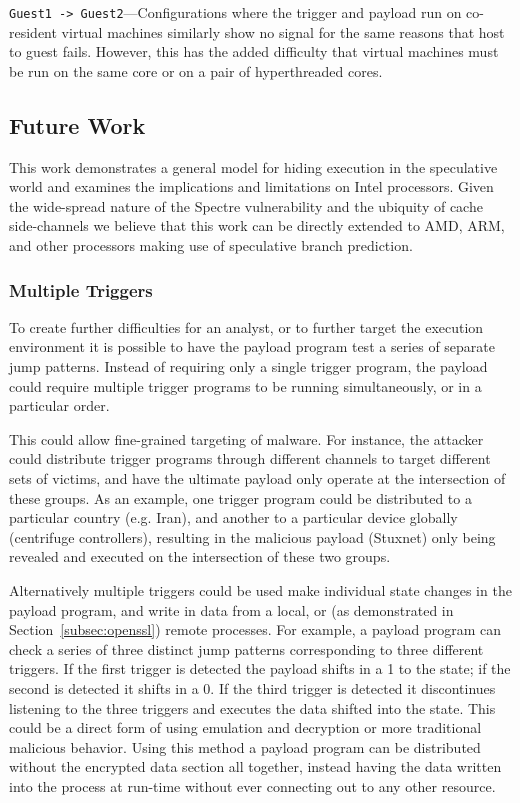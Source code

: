 \texttt{Guest1 -> Guest2}---Configurations where the trigger and payload run on
co-resident virtual machines similarly show no signal for the same reasons that
host to guest \speculake fails. However, this has the added difficulty that
virtual machines must be run on the same core or on a pair of hyperthreaded
cores.




\subsection{Future Work}
\label{subsec:future-work}

This work demonstrates a general model for hiding execution in 
the speculative world and examines the implications and limitations on 
Intel processors. Given the wide-spread nature of the Spectre vulnerability 
and the ubiquity of cache side-channels we believe that this work can 
be directly extended to AMD, ARM, and other processors making use of
speculative branch prediction.

\subsubsection{Multiple Triggers}
To create further difficulties for an analyst, or to further target the
execution environment it is possible to have the payload program test a series
of separate jump patterns. Instead of requiring only a single trigger program,
the payload could require multiple trigger programs to be running
simultaneously, or in a particular order.

This could allow fine-grained targeting of malware. For instance, the attacker
could distribute trigger programs through different channels to target different sets
of victims, and have the ultimate payload only operate at the intersection of
these groups. As an example, one trigger program could be distributed to a
particular country (e.g. Iran), and another to a particular device globally
(centrifuge controllers), resulting in the malicious payload (Stuxnet) only
being revealed and executed on the intersection of these two groups.


\smallskip

Alternatively multiple triggers could be used make individual state changes in
the payload program, and write in data from a local, or (as demonstrated in
Section~\ref{subsec:openssl}) remote processes. For example, a payload program
can check a series of three distinct jump patterns corresponding to three
different triggers. If the first trigger is detected the payload shifts in a 1
to the state; if the second is detected it shifts in a 0. If the third trigger
is detected it discontinues listening to the three triggers and executes the
data shifted into the state.
This could be a direct form of \speculake using emulation and
decryption or more traditional malicious behavior. Using this method a payload
program can be distributed without the encrypted data section all together,
instead having the data written into the process at run-time without ever
connecting out to any other resource.

